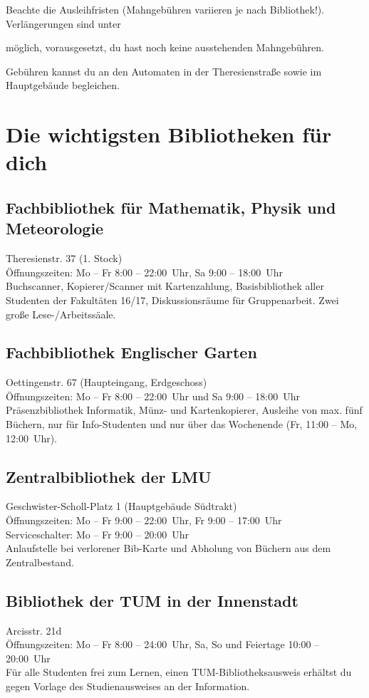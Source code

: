 Beachte die Ausleihfristen (Mahngebühren variieren je nach Bibliothek!). 
Verlängerungen sind unter 
\begin{urlList}
\end{urlList}
möglich, vorausgesetzt, du hast noch keine ausstehenden Mahngebühren.

Gebühren kannst du an den Automaten in der Theresienstraße sowie
im Hauptgebäude begleichen.


\section{Die wichtigsten Bibliotheken für dich}

\subsection*{Fachbibliothek für Mathematik, Physik und Meteorologie}
Theresienstr. 37 (1. Stock)\\
Öffnungszeiten: Mo -- Fr 8:00 -- 22:00~Uhr, Sa 9:00 -- 18:00~Uhr\\
Buchscanner, Kopierer/Scanner mit Kartenzahlung, Basisbibliothek aller
Studenten der Fakultäten 16/17, Diskussionsräume für Gruppenarbeit.
Zwei große Lese-/Arbeitssäale.

\subsection*{Fachbibliothek Englischer Garten}
Oettingenstr. 67 (Haupteingang, Erdgeschoss)\\
Öffnungszeiten: Mo -- Fr 8:00 -- 22:00~Uhr und Sa 9:00 -- 18:00~Uhr\\
Präsenzbibliothek Informatik, Münz- und Kartenkopierer, Ausleihe von max. fünf Büchern, nur für Info-Studenten und nur über das Wochenende (Fr, 11:00 -- Mo, 12:00~Uhr).

\subsection*{Zentralbibliothek der LMU}
Geschwister-Scholl-Platz 1 (Hauptgebäude Südtrakt)\\
Öffnungszeiten: Mo -- Fr 9:00 -- 22:00~Uhr, Fr 9:00 -- 17:00~Uhr\\
Serviceschalter: Mo -- Fr 9:00 -- 20:00~Uhr\\
Anlaufstelle bei verlorener Bib-Karte und Abholung von Büchern aus dem Zentralbestand.

\subsection*{Bibliothek der TUM in der Innenstadt}
Arcisstr. 21d\\
Öffnungszeiten: Mo -- Fr 8:00 -- 24:00~Uhr, Sa, So und Feiertage 10:00 -- 20:00~Uhr\\
Für alle Studenten frei zum Lernen, einen TUM-Bibliotheksausweis erhältst du gegen Vorlage des Studienausweises an der Information.
\begin{urlList}
\end{urlList}

